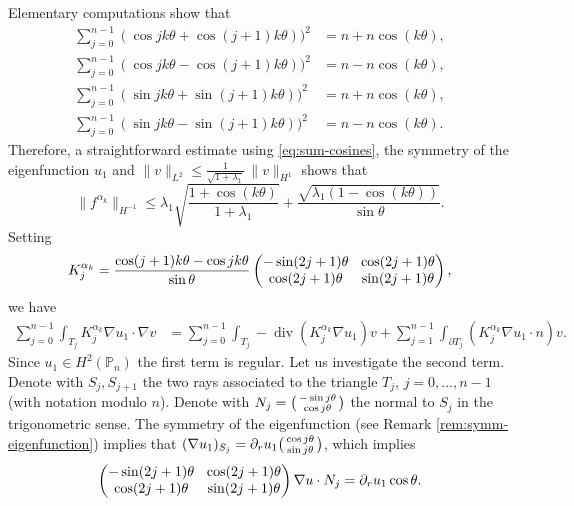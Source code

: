 \documentclass[JEP,XML,SOM,Unicode,ThmDefs,NoFloatCountersInSection,published]{cedram}
\newenvironment{smallpmatrix}{\big(\begin{smallmatrix}}{\end{smallmatrix}\big)}
\newcommand{\colsep}{\arraycolsep4.5pt}
\theoremstyle{plain}
\theoremstyle{definition}
\newcommand{\di}{\operatorname{div}}
\def\Pp{{\mathbb{P}_n}}
\begin{document}
Elementary computations show that
\begin{equation}
\begin{aligned}\label{eq:sum-cosines}
\sum_{j=0}^{n-1} (\cos jk\theta+\cos(j+1)k\theta))^2 &= n+n\cos (k\theta),\\
\sum_{j=0}^{n-1} (\cos jk\theta-\cos(j+1)k\theta))^2 &= n-n\cos (k\theta),\\
\sum_{j=0}^{n-1} (\sin jk\theta+\sin(j+1)k\theta))^2 &= n+n\cos (k\theta),\\
\sum_{j=0}^{n-1} (\sin jk\theta-\sin(j+1)k\theta))^2 &= n-n\cos (k\theta).
\end{aligned}
\end{equation}
Therefore, a straightforward estimate using \eqref{eq:sum-cosines}, the symmetry of the eigenfunction $u_1$ and $\|v\|_{L^2} \leq \frac{1}{\sqrt{1+\lambda_1}}\,\|v\|_{H^1}$ shows that
\[
\|f^{\alpha_k}\|_{H^{-1}} \leq \lambda_1 \sqrt{\frac{1+\cos(k\theta)}{1+\lambda_1}} +\frac{\sqrt{\lambda_1(1-\cos(k\theta))}}{\sin \theta}.
\]
Setting
\[\colsep
K_j^{\alpha_k} = \frac{\cos(j+1)k\theta-\cos jk\theta}{\sin \theta} \begin{pmatrix}
-\sin (2j+1)\theta & \cos (2j+1) \theta \\
\cos(2j+1)\theta & \sin (2j+1)\theta
\end{pmatrix},
\]
we have
\begin{align*}
\sum_{j=0}^{n-1} \int_{T_j} K_j^{\alpha_k}\nabla u_1 \cdot \nabla v & = \sum_{j=0}^{n-1} \int_{T_j} -\di (K_j^{\alpha_k}\nabla u_1) v + \sum_{j=1}^{n-1} \int_{\partial T_j} (K_j^{\alpha_k}\nabla u_1 \cdot n) v.
\end{align*}
Since $u_1 \in H^2(\Pp)$ the first term is regular. Let us investigate the second term. Denote with $S_j, S_{j+1}$ the two rays associated to the triangle $T_j$, $j=0,\dots,n-1$ (with notation modulo $n$). Denote with $N_j=\begin{smallpmatrix}
-\sin j\theta \\ \cos j\theta
\end{smallpmatrix}$ the normal to $S_j$ in the trigonometric sense.
The symmetry of the eigenfunction (see Remark \ref{rem:symm-eigenfunction}) implies that $(\nabla u_1)_{S_j} = \partial_r u_1 \begin{smallpmatrix}
\cos j\theta \\ \sin j\theta
\end{smallpmatrix}$, which implies
\[\colsep
\begin{pmatrix}
-\sin(2j+1)\theta & \cos(2j+1)\theta \\
\cos(2j+1)\theta & \sin (2j+1)\theta
\end{pmatrix}
\nabla u \cdot N_j = \partial_r u_1 \cos \theta.
\]
\end{document}
